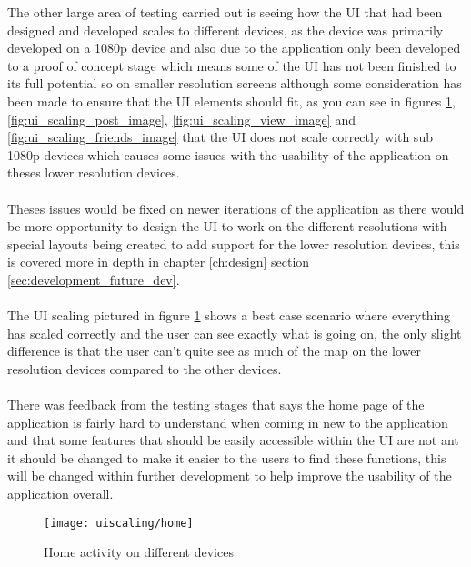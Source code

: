 The other large area of testing carried out is seeing how the UI that had been designed and developed scales to different devices, as the device was primarily developed on a 1080p device and also due to the application only been developed to a proof of concept stage which means some of the UI has not been finished to its full potential so on smaller resolution screens although some consideration has been made to ensure that the UI elements should fit, as you can see in figures \ref{fig:ui_scaling_home_image}, \ref{fig:ui_scaling_post_image}, \ref{fig:ui_scaling_view_image} and \ref{fig:ui_scaling_friends_image} that the UI does not scale correctly with sub 1080p devices which causes some issues with the usability of the application on theses lower resolution devices.\\
\\
Theses issues would be fixed on newer iterations of the application as there would be more opportunity to design the UI to work on the different resolutions with special layouts being created to add support for the lower resolution devices, this is covered more in depth in chapter \ref{ch:design} section \ref{sec:development_future_dev}.\\
\\
The UI scaling pictured in figure \ref{fig:ui_scaling_home_image} shows a best case scenario where everything has scaled correctly and the user can see exactly what is going on, the only slight difference is that the user can't quite see as much of the map on the lower resolution devices compared to the other devices.\\
\\
There was feedback from the testing stages that says the home page of the application is fairly hard to understand when coming in new to the application and that some features that should be easily accessible within the UI are not ant it should be changed to make it easier to the users to find these functions, this will be changed within further development to help improve the usability of the application overall.

\begin{figure}[H]
    \centering
    \texttt{[image: uiscaling/home]}
    \caption{Home activity on different devices}
    \label{fig:ui_scaling_home_image}
\end{figure}

